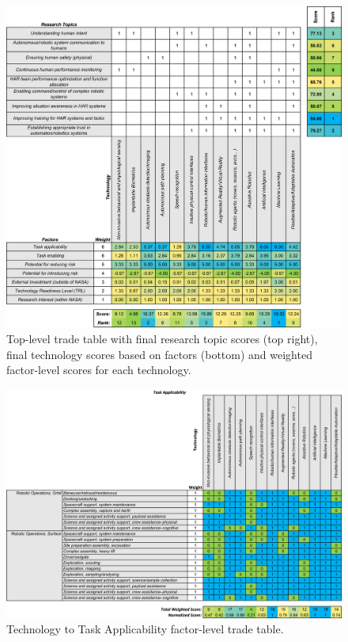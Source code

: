 \begin{figure}[b!]
    \begin{center}
        \includegraphics[width=0.8\linewidth]{figures/TradeStudy/figurea1.png}
        \caption[Top-level trade table]{Top-level trade table with final research topic scores (top right), final technology scores based on factors (bottom) and weighted factor-level scores for each technology.}
    \end{center}
\end{figure}

\begin{figure}[b!]
    \begin{center}
        \includegraphics[width=0.8\linewidth]{figures/TradeStudy/figurea2.png}
        \caption[Technology to Task Applicability factor-level trade table]{Technology to Task Applicability factor-level trade table.}
    \end{center}
\end{figure}


